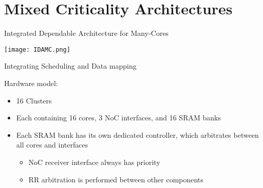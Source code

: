 \section{Mixed Criticality Architectures}




\begin{frame}{Integrated Dependable Architecture for Many-Cores}

\begin{center}
\texttt{[image: IDAMC.png]}
\end{center}

\end{frame}
\begin{frame}{Integrating Scheduling and Data mapping}

Hardware model:

\begin{itemize}
\item {} {16 Clusters}
\item {} {Each containing 16 cores, 3 NoC interfaces, and 16 SRAM banks}
\item {} {Each SRAM bank has its own dedicated controller, which arbitrates between all cores and interfaces}
 {
\begin{itemize}
\item NoC receiver interface always has priority
\item RR arbitration is performed between other components
\end{itemize}}
\end{itemize}

\end{frame}


